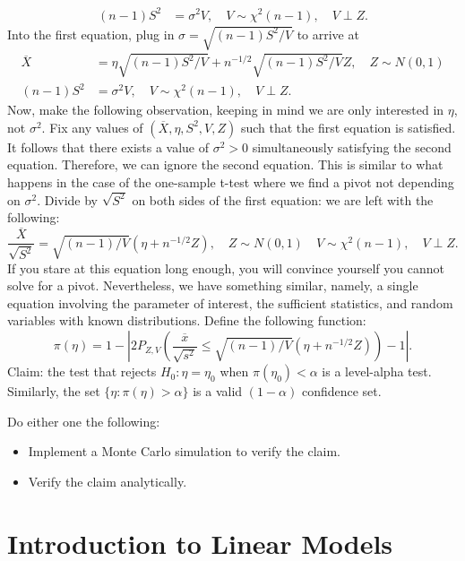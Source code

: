 \documentclass[
]{book}
\providecommand{\tightlist}{%
  \setlength{\itemsep}{0pt}\setlength{\parskip}{0pt}}
\theoremstyle{definition}
\theoremstyle{definition}
\theoremstyle{definition}
\theoremstyle{definition}
\theoremstyle{remark}
\begin{document}
\begin{enumerate}
\begin{align*}
  (n-1)S^2 &= \sigma^2 V, \quad V\sim \chi^2(n-1), \quad V\perp Z.
  \end{align*}
  Into the first equation, plug in \(\sigma = \sqrt{(n-1)S^2/V}\) to arrive at
  \begin{align*} 
  \overline X &= \eta\sqrt{(n-1)S^2/V} + n^{-1/2}\sqrt{(n-1)S^2/V} Z, \quad Z\sim N(0,1)\\
  (n-1)S^2 &= \sigma^2 V, \quad V\sim \chi^2(n-1), \quad V\perp Z.
  \end{align*}
  Now, make the following observation, keeping in mind we are only interested in \(\eta\), not \(\sigma^2\). Fix any values of \((\overline X, \eta, S^2, V, Z)\) such that the first equation is satisfied. It follows that there exists a value of \(\sigma^2>0\) simultaneously satisfying the second equation. Therefore, we can ignore the second equation. This is similar to what happens in the case of the one-sample t-test where we find a pivot not depending on \(\sigma^2\). Divide by \(\sqrt{S^2}\) on both sides of the first equation: we are left with the following:
  \[\frac{\overline X}{\sqrt{S^2}} = \sqrt{(n-1)/V}\left (\eta + n^{-1/2}Z\right), \quad Z\sim N(0,1)\quad V\sim \chi^2(n-1), \quad V\perp Z.\]
  If you stare at this equation long enough, you will convince yourself you cannot solve for a pivot. Nevertheless, we have something similar, namely, a single equation involving the parameter of interest, the sufficient statistics, and random variables with known distributions. Define the following function:
  \[\pi(\eta) = 1-\left|2P_{Z,V}\left(\frac{\overline x}{\sqrt{s^2}} \leq \sqrt{(n-1)/V}\left (\eta + n^{-1/2}Z\right)\right) - 1\right|.\]
  Claim: the test that rejects \(H_0:\eta= \eta_0\) when \(\pi(\eta_0) <\alpha\) is a level-alpha test. Similarly, the set \(\{\eta: \pi(\eta) > \alpha\}\) is a valid \((1-\alpha)\) confidence set.
\end{enumerate}

Do either one the following:

\begin{itemize}
\tightlist
\item
  Implement a Monte Carlo simulation to verify the claim.
\item
  Verify the claim analytically.
\end{itemize}

\hypertarget{introduction-to-linear-models}{%
\chapter{Introduction to Linear Models}\label{introduction-to-linear-models}}
\end{document}
